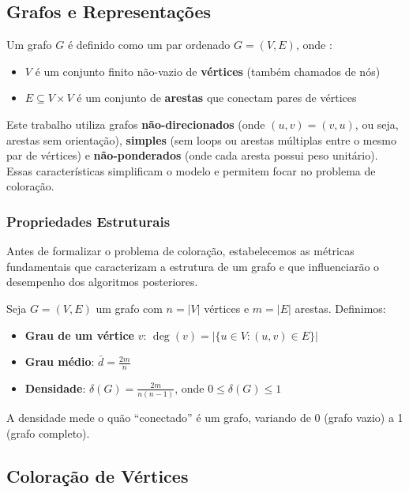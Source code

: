 \documentclass[12pt]{article}
\begin{document}
\subsection{Grafos e Representações}

Um grafo $G$ é definido como um par ordenado $G = (V, E)$, onde \cite{bondy2008graph}:
\begin{itemize}
    \item $V$ é um conjunto finito não-vazio de \textbf{vértices} (também chamados de nós)
    \item $E \subseteq V \times V$ é um conjunto de \textbf{arestas} que conectam pares de vértices
\end{itemize}

Este trabalho utiliza grafos \textbf{não-direcionados} (onde $(u,v) = (v,u)$, ou seja, arestas sem orientação), \textbf{simples} (sem loops ou arestas múltiplas entre o mesmo par de vértices) e \textbf{não-ponderados} (onde cada aresta possui peso unitário). Essas características simplificam o modelo e permitem focar no problema de coloração.

\subsubsection{Propriedades Estruturais}

Antes de formalizar o problema de coloração, estabelecemos as métricas fundamentais que caracterizam a estrutura de um grafo e que influenciarão o desempenho dos algoritmos posteriores.

Seja $G = (V, E)$ um grafo com $n = |V|$ vértices e $m = |E|$ arestas. Definimos:

\begin{itemize}
    \item \textbf{Grau de um vértice} $v$: $\deg(v) = |\{u \in V : (u,v) \in E\}|$
    \item \textbf{Grau médio}: $\bar{d} = \frac{2m}{n}$
    \item \textbf{Densidade}: $\delta(G) = \frac{2m}{n(n-1)}$, onde $0 \leq \delta(G) \leq 1$
\end{itemize}

A densidade mede o quão ``conectado'' é um grafo, variando de 0 (grafo vazio) a 1 (grafo completo).

\subsection{Coloração de Vértices}
\end{document}
